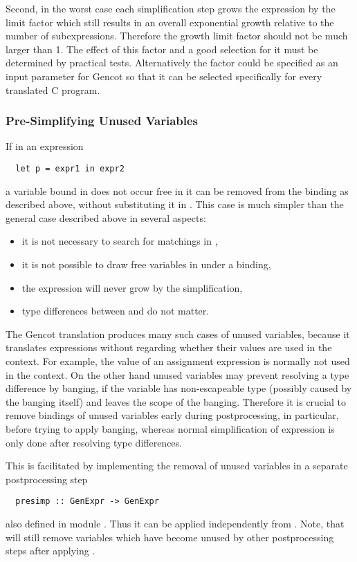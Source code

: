 Second, in the worst case each simplification step grows the expression by the limit factor which still results in an overall exponential growth
relative to the number of subexpressions. Therefore the growth limit factor should not be much larger than 1. The effect of this
factor and a good selection for it must be determined by practical tests. Alternatively the factor could be specified as an input 
parameter for Gencot so that it can be selected specifically for every translated C program.

\subsubsection{Pre-Simplifying Unused Variables}

If in an expression
\begin{verbatim}
  let p = expr1 in expr2
\end{verbatim}
a variable bound in  does not occur free in  it can be removed from the binding  as described above,
without substituting it in . This case is much simpler than the general case described above in several aspects:
\begin{itemize}
\item it is not necessary to search for matchings in ,
\item it is not possible to draw free variables in  under a binding,
\item the expression will never grow by the simplification,
\item type differences between  and  do not matter.
\end{itemize}

The Gencot translation produces many such cases of unused variables, because it translates expressions without regarding whether
their values are used in the context. For example, the value of an assignment expression is normally not used in the context. On the
other hand unused variables may prevent resolving a type difference by banging, if the variable has non-escapeable type (possibly
caused by the banging itself) and leaves the scope of the banging. Therefore it is crucial to remove bindings of unused variables
early during postprocessing, in particular, before trying to apply banging, whereas normal simplification of  expression
is only done after resolving type differences.

This is facilitated by implementing the removal of unused variables in a separate postprocessing step
\begin{verbatim}
  presimp :: GenExpr -> GenExpr
\end{verbatim}
also defined in module . Thus it can be applied independently from . Note, that
 will still remove variables which have become unused by other postprocessing steps after applying .

